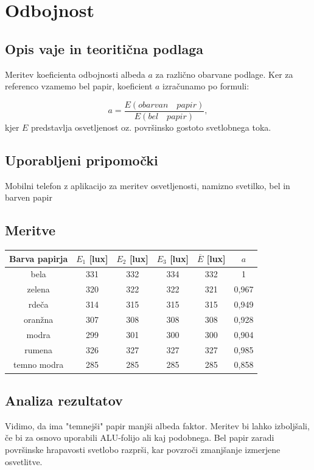 \documentclass[12pt]{article}
\begin{document}
\newpage
\section{Odbojnost}
	\subsection*{Opis vaje in teoritična podlaga}
	Meritev koeficienta odbojnosti albeda $a$ za različno obarvane podlage. Ker za referenco
	vzamemo bel papir, koeficient $a$ izračunamo po formuli:

	\begin{equation}
		a = \frac{E(obarvan \quad papir)}{E(bel \quad papir)},
	\end{equation}
	kjer $E$ predstavlja osvetljenost oz. površinsko gostoto svetlobnega toka. 
	\subsection*{Uporabljeni pripomočki}
	Mobilni telefon z aplikacijo za meritev osvetljenosti, namizno svetilko, bel in barven
	papir

	\subsection*{Meritve}
	\begin{table}[!h]
		\centering
		\begin{tabular}{|c|c|c|c|c|c|}
		\hline
		Barva papirja & $E_1$ [lux] & $E_2$ [lux] 	& $E_3$ [lux] 	& $\overline{E}$ [lux] 	& $a$   \\ \hline
		bela          & 331			& 332			& 334			& 332 					& 1     \\ \hline
		zelena        & 320 		& 322 			& 322 			& 321 					& 0,967 \\ \hline
		rdeča         & 314 		& 315 			& 315 			& 315 					& 0,949 \\ \hline
		oranžna       & 307 		& 308 			& 308 			& 308 					& 0,928 \\ \hline
		modra         & 299 		& 301 			& 300 			& 300 					& 0,904 \\ \hline
		rumena        & 326 		& 327 			& 327 			& 327 					& 0,985 \\ \hline
		temno modra   & 285 		& 285 			& 285 			& 285 					& 0,858 \\ \hline
		\end{tabular}
	\end{table}

	\subsection*{Analiza rezultatov}
	Vidimo, da ima "temnejši" papir manjši albeda faktor. Meritev bi lahko izboljšali, če 
	bi za osnovo uporabili ALU-folijo ali kaj podobnega. Bel papir zaradi površinske 
	hrapavosti svetlobo razprši, kar povzroči zmanjšanje izmerjene osvetlitve.
\end{document}
